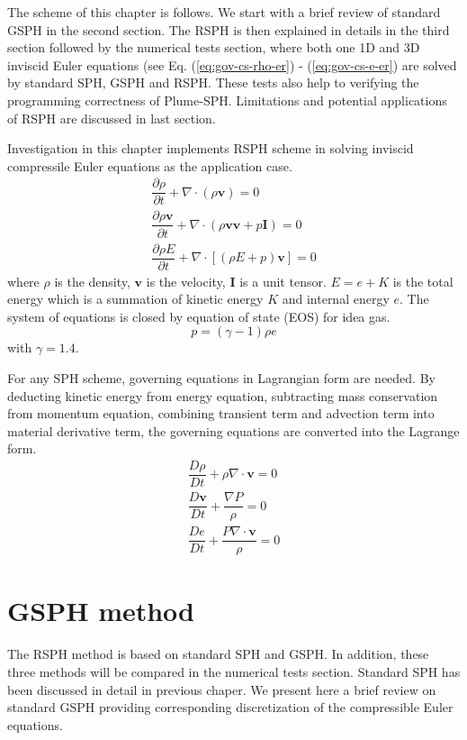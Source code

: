 The scheme of this chapter is follows. We start with a brief review of standard GSPH in the second section. The RSPH is then explained in details in the third section followed by the numerical tests section, where both one 1D and 3D inviscid Euler equations (see Eq. (\ref{eq:gov-cs-rho-er}) - (\ref{eq:gov-cs-e-er}) are solved by standard SPH, GSPH and RSPH. These tests also help to verifying the programming correctness of Plume-SPH. Limitations and potential applications of RSPH are discussed in last section. 

Investigation in this chapter implements RSPH scheme in solving inviscid compressile Euler equations as the application case.  
\begin{align}
\dfrac{\partial \rho}{\partial t} + \nabla \cdot \left(\rho \textbf{v} \right) = 0 \label{eq:gov-cs-rho-er} \\
\dfrac{\partial \rho \textbf{v}}{\partial t} + \nabla \cdot \left(\rho \textbf{v} \textbf{v} + p\textbf{I}\right) = 0 \label{eq:gov-cs-v-er} \\
\dfrac{\partial \rho E}{\partial t} + \nabla \cdot \left[\left(\rho E + p \right)\textbf{v}\right] = 0 \label{eq:gov-cs-e-er}
\end{align}
where $\rho$ is the density, $\textbf{v}$ is the velocity, $\textbf{I}$ is a unit tensor.
$E = e + K $ is the total energy which is a summation of kinetic energy $K$ and internal energy $e$.
The system of equations is closed by equation of state (EOS) for idea gas.
\begin{equation}
p = \left(\gamma - 1\right)\rho e \label{eq:EOS-er}
\end{equation}
with $\gamma=1.4$.

For any SPH scheme, governing equations in Lagrangian form are needed. By deducting kinetic energy from energy equation, subtracting mass conservation from momentum equation, combining transient term and advection term into material derivative term, the governing equations are converted into the Lagrange form. 
\begin{align}
\dfrac{D \rho}{D t} + \rho \nabla \cdot \textbf{v} = 0 \label{eq:gov-nc-rho-er}\\
\dfrac{D \textbf{v}}{D t} + \dfrac{\nabla P}{\rho} =0 \label{eq:gov-nc-v-er}\\
\dfrac{D e}{D t} + \dfrac{P \nabla \cdot \textbf{v}}{\rho} = 0 \label{eq:gov-nc-e-er}
\end{align}

\section{GSPH method} \label{sec:GSPH-method}
The RSPH method is based on standard SPH and GSPH. In addition, these three methods will be compared in the numerical tests section. Standard SPH has been discussed in detail in previous chaper. We present here a brief review on standard GSPH providing corresponding discretization of the compressible Euler equations.
 
